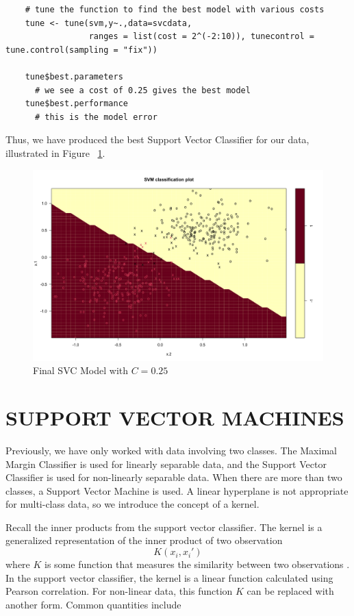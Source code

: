 \documentclass[12pt]{article}
\begin{document}
\begin{verbatim}
    # tune the function to find the best model with various costs
    tune <- tune(svm,y~.,data=svcdata, 
                 ranges = list(cost = 2^(-2:10)), tunecontrol = tune.control(sampling = "fix"))
    
    tune$best.parameters
      # we see a cost of 0.25 gives the best model
    tune$best.performance
      # this is the model error
\end{verbatim}

Thus, we have produced the best Support Vector Classifier for our data, illustrated in Figure ~\ref{fig_svc_final_model}.

\begin{figure}[ht]
    \centering
    \includegraphics[width=5in]{Figures/svc_final_model.png}
    \caption{Final SVC Model with \(C = 0.25\)}
    \label{fig_svc_final_model}
\end{figure}

\section{SUPPORT VECTOR MACHINES}

Previously, we have only worked with data involving two classes. The Maximal Margin Classifier is used for linearly separable data, and the Support Vector Classifier is used for non-linearly separable data. When there are more than two classes, a Support Vector Machine is used. A linear hyperplane is not appropriate for multi-class data, so we introduce the concept of a kernel.

Recall the inner products from the support vector classifier. The kernel is a generalized representation of the inner product of two observation \[K(x_i,x_i')\] where \(K\) is some function that measures the similarity between two observations \citep{introstatlearning}. In the support vector classifier, the kernel is a linear function calculated using Pearson correlation. For non-linear data, this function \(K\) can be replaced with another form. Common quantities include
\end{document}

